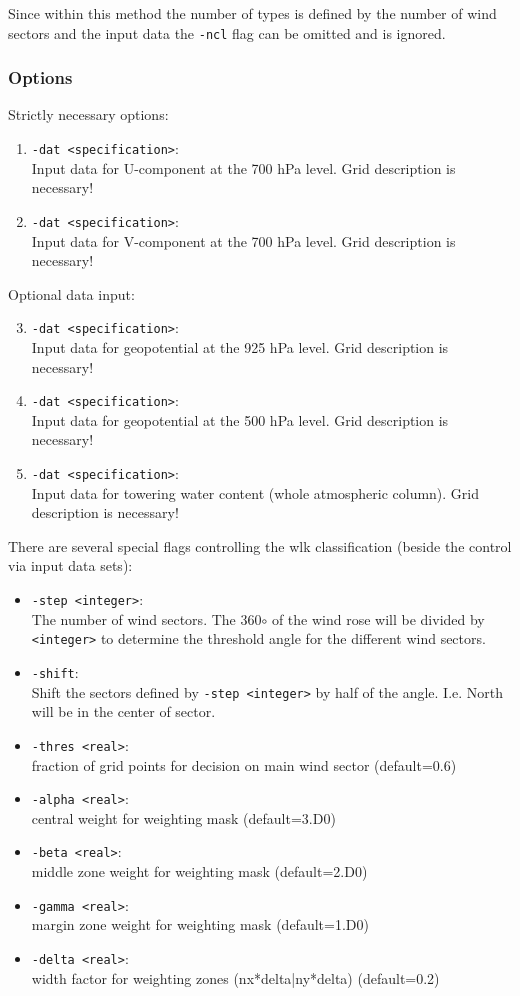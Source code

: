 \documentclass[12pt, oneside, a4paper, headsepline, plainheadsepline]{scrbook}
\begin{document}
Since within this method the number of types is defined by the number of wind sectors and the input data the 
\verb+-ncl+ flag can be omitted and is ignored.

\subsubsection*{Options}
Strictly necessary options:
\begin{enumerate}
 \item \verb+-dat <specification>+:\\ Input data for U-component at the 700 hPa level. Grid description is 
 necessary!
 \item \verb+-dat <specification>+:\\ Input data for V-component at the 700 hPa level. Grid description is 
 necessary!
\end{enumerate}
Optional data input:
\begin{enumerate}
 \setcounter{enumi}{2}
 \item \verb+-dat <specification>+:\\ Input data for geopotential at the 925 hPa level. Grid description is 
 necessary!
 \item \verb+-dat <specification>+:\\ Input data for geopotential at the 500 hPa level. Grid description is 
 necessary!
 \item \verb+-dat <specification>+:\\ Input data for towering water content (whole atmospheric column). Grid description is 
 necessary!
\end{enumerate}
There are several special flags controlling the wlk classification (beside the control via input data sets):
\begin{itemize}
\item \verb+-step <integer>+: \\
	The number of wind sectors. The 360$\circ$ of the wind rose will be divided by \verb+<integer>+ to 
	determine the threshold angle for the different wind sectors.
\item \verb+-shift+: \\
	Shift the sectors defined by \verb+-step <integer>+ by half of the angle. I.e. North will be in the
	center of sector.
\item \verb+-thres <real>+: \\
	fraction of grid points for decision on main wind sector (default=0.6)
\item \verb+-alpha <real>+: \\
	central weight for weighting mask (default=3.D0)
\item \verb+-beta <real>+: \\
	middle zone weight for weighting mask (default=2.D0)
\item \verb+-gamma <real>+: \\
	margin zone weight for weighting mask (default=1.D0)
\item \verb+-delta <real>+: \\
	width factor for weighting zones (nx*delta|ny*delta) (default=0.2)
\end{itemize}
\end{document}
